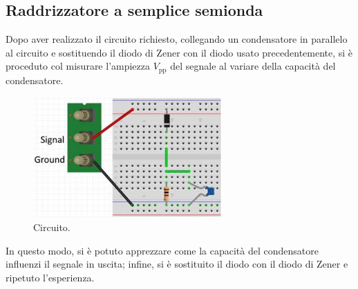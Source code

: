 \documentclass[a4paper]{article}
\begin{document}
		\subsection{Raddrizzatore a semplice semionda}
			Dopo aver realizzato il circuito richiesto, collegando un condensatore in parallelo al circuito e sostituendo il diodo di Zener con il diodo usato precedentemente, si è proceduto col misurare l'ampiezza $ V_{\mathrm{pp}} $ del segnale al variare della capacità del condensatore.
			\begin{figure}[h!]
				\centering
				\includegraphics[scale=0.7]{raddrizzatoreASempliceSemiondaCircuito}
				\caption{Circuito.}
				\label{fig:raddrizzatoreASempliceSemiondaCircuito}
			\end{figure}
			\newpage
			In questo modo, si è potuto apprezzare come la capacità del condensatore influenzi il segnale in uscita; infine, si è sostituito il diodo con il diodo di Zener e ripetuto l'esperienza.
\end{document}
